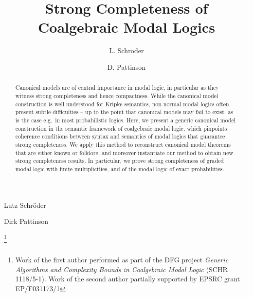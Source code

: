 \documentclass[proceedings]{stacs}
\theoremstyle{definition}
\theoremstyle{plain}
\begin{document}
\title{Strong Completeness of Coalgebraic Modal Logics}

\author[DFKIUHB]{L. Schr{\"o}der}{Lutz
  Schr{\"o}der}
\address[DFKIUHB]{DFKI Bremen and Department of Computer Science,  
Universit\"at  Bremen}
\author[IC]{D. Pattinson}{Dirk Pattinson}
\address[IC]{Department of Computing, 
Imperial College London}


\thanks{Work of the first author performed as part of the DFG project
  \emph{Generic Algorithms and Complexity Bounds in Coalgebraic Modal
    Logic} (SCHR 1118/5-1). Work of the second author partially
  supported by EPSRC grant EP/F031173/1}



\begin{abstract}
  Canonical models are of central importance in modal logic, in
  particular as they witness strong completeness and hence
  compactness. While the canonical model construction is well
  understood for Kripke semantics, non-normal modal logics often
  present subtle difficulties -- up to the point that canonical models
  may fail to exist, as is the case e.g.\ in most probabilistic
  logics.  Here, we present a generic canonical model construction in
  the semantic framework of coalgebraic modal logic, which pinpoints
	coherence conditions between syntax and semantics of modal logics
	that guarantee strong completeness.
  We apply this method to reconstruct canonical
  model theorems that are either known or folklore, and moreover instantiate 
  our method to obtain new strong
  completeness results. In particular, we prove strong completeness of
  graded modal logic with finite multiplicities, and of the modal
  logic of exact probabilities.
\end{abstract}

\maketitle
\end{document}
